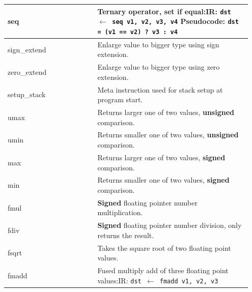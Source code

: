 \documentclass[course=eragp]{aspdoc}
\begin{document}
\begin{center}
\begin{longtable}{p{0.35\linewidth} | p{0.6\linewidth}}
        \hline
        seq          & Ternary operator, set if equal:\newline IR: \texttt{dst $\leftarrow$ seq v1, v2, v3, v4} \newline
        Pseudocode: \texttt{dst = (v1 == v2) ? v3 : v4}                                                                                           \\
        \hline
        sign\_extend & Enlarge value to bigger type using sign extension.                                                                         \\
        \hline
        zero\_extend & Enlarge value to bigger type using zero extension.                                                                         \\
        \hline
        setup\_stack & Meta instruction used for stack setup at program start.                                                                    \\
        \hline
        umax         & Returns larger one of two values, \textbf{unsigned} comparison.                                                            \\
        \hline
        umin         & Returns smaller one of two values, \textbf{unsigned} comparison.                                                           \\
        \hline
        max          & Returns larger one of two values, \textbf{signed} comparison.                                                              \\
        \hline
        min          & Returns smaller one of two values, \textbf{signed} comparison.                                                             \\
        \hline
        fmul         & \textbf{Signed} floating pointer number multiplication.                                                                    \\
        \hline
        fdiv         & \textbf{Signed} floating pointer number division, only returns the result.                                                 \\
        \hline
        fsqrt        & Takes the square root of two floating point values.                                                                        \\
        \hline
        fmadd        & Fused multiply add of three floating point values:\newline IR: \texttt{dst $\leftarrow$ fmadd v1, v2, v3} \newline

\end{longtable}
\end{center}
\end{document}

